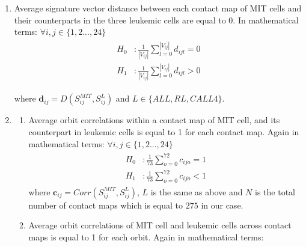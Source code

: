 \documentclass[a4,center,fleqn]{NAR}
\begin{document}
\begin{enumerate}
    \item Average signature vector distance between each 
        contact map of MIT cells and
        their counterparts in the three leukemic cells
        are equal to $0$. In mathematical terms:
        $\forall i,j \in \{1, 2 ..., 24\}$
        \begin{align}
            \begin{split}
                H_0&: \frac{1}{|V_{ij}|}\sum_{l=0}^{|V_{ij}|}{d_{ijl}} = 0 \\
                H_1&: \frac{1}{|V_{ij}|}\sum_{l=0}^{|V_{ij}|}{d_{ijl}} > 0
            \end{split}
            \label{eq:h1}
        \end{align}

        where 
        $\mathbf{d}_{ij} = D(S^{MIT}_{ij}, S^L_{ij})$ and $L \in \{ALL, RL, CALL4\}$.

        \item 
            \begin{enumerate}
                \item Average orbit correlations within a contact map of MIT cell, 
                    and its counterpart in leukemic cells is equal to 1
                    for each contact map.
                Again in mathematical terms:
                $\forall i,j \in \{1, 2 ..., 24\}$
                \begin{align}
                    \begin{split}
                        H_0&: \frac{1}{73}\sum_{o=0}^{72}{c_{ijo}} = 1 \\
                        H_1&: \frac{1}{73}\sum_{o=0}^{72}{c_{ijo}} < 1
                    \end{split}
                    \label{eq:h2b}
                \end{align}
                        where $\mathbf{c}_{ij} = Corr(S^{MIT}_{ij}, S^L_{ij})$, $L$ 
                        is the same as above and $N$ 
                        is the total number of contact maps which 
                        is equal to $275$ in our case.

                \item Average orbit correlations  of MIT cell
                    and leukemic cells across contact maps is equal to 1
                    for each orbit.
                Again in mathematical terms:

                        \smallskip


\end{enumerate}
\end{enumerate}
\end{document}
